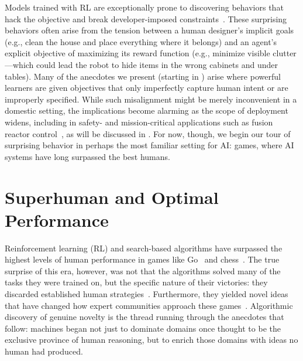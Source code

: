 \documentclass[10pt]{article}
\def\citep#1{}%
\begin{document}
Models trained with RL are exceptionally prone to discovering behaviors that hack the objective and break developer-imposed constraints~\citep{wang2022adversarial, amodei2016concrete, specgamingkrakovna2020}.
These surprising behaviors often arise from the tension between a human designer's implicit goals (e.g., clean the house and place everything where it belongs) and an agent's explicit objective of maximizing its reward function (e.g., minimize visible clutter---which could lead the robot to hide items in the wrong cabinets and under tables).
Many of the anecdotes we present (starting in ) arise where powerful learners are given objectives that only imperfectly capture human intent or are improperly specified.
While such misalignment might be merely inconvenient in a domestic setting, the implications become alarming as the scope of deployment widens, including in safety- and mission-critical applications such as fusion reactor control~\citep{Degrave2022tokamak}, as will be discussed in . 
For now, though, we begin our tour of surprising behavior in perhaps the most familiar setting for AI: games, where AI systems have long surpassed the best humans.

\section{Superhuman and Optimal Performance}
\label{superhuman}

Reinforcement learning (RL) and search-based algorithms have surpassed the highest levels of human performance in games like Go~\citep{Silver2016} and chess~\citep{Campbell2002deepblue, silver2018general}.
The true surprise of this era, however, was not that the algorithms solved many of the tasks they were trained on, but the specific nature of their victories: they discarded established human strategies~\citep{BrownLibratus2017, silver2018general, wurman2022outracing}.
Furthermore, they yielded novel ideas that have changed how expert communities approach these games~\citep{leelazero, Shin2023Go}.
Algorithmic discovery of genuine novelty is the thread running through the anecdotes that follow: machines began not just to dominate domains once thought to be the exclusive province of human reasoning, but to enrich those domains with ideas no human had produced. 
\end{document}

